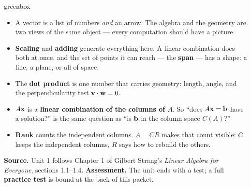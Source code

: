 \begin{skillbox}{greenbox}
\small
\begin{itemize}[leftmargin=1.3em, itemsep=3pt, topsep=1pt]
  \item A vector is a list of numbers \emph{and} an arrow. The algebra and the geometry are
        two views of the same object --- every computation should have a picture.
  \item \textbf{Scaling} and \textbf{adding} generate everything here. A linear combination
        does both at once, and the set of points it can reach --- the \textbf{span} --- has a
        shape: a line, a plane, or all of space.
  \item The \textbf{dot product} is one number that carries geometry: length, angle, and the
        perpendicularity test $\mathbf{v}\cdot\mathbf{w} = 0$.
  \item $A\mathbf{x}$ is a \textbf{linear combination of the columns of $A$}. So ``does $A\mathbf{x} = \mathbf{b}$
        have a solution?'' is the same question as ``is $\mathbf{b}$ in the column space $C(A)$?''
  \item \textbf{Rank} counts the independent columns. $A = CR$ makes that count visible: $C$
        keeps the independent columns, $R$ says how to rebuild the others.
\end{itemize}
\end{skillbox}

\vspace{0.10in}

\begin{remindbox}
\small
\textbf{Source.} Unit 1 follows Chapter 1 of Gilbert Strang's \emph{Linear Algebra for
Everyone}, sections 1.1--1.4.\quad
\textbf{Assessment.} The unit ends with a test; a full \textbf{practice test} is bound at the
back of this packet.
\end{remindbox}
